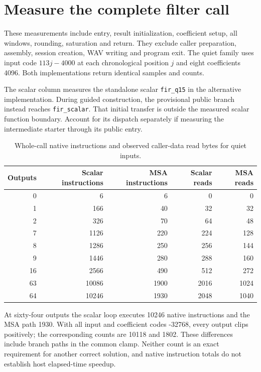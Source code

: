 \section{Measure the complete filter call}
These measurements include entry, result initialization, coefficient setup, all windows,
rounding, saturation and return. They exclude caller preparation, assembly, session
creation, WAV writing and program exit. The quiet family uses input code
\(113j-4000\) at each chronological position \(j\) and eight coefficients 4096.
Both implementations return identical samples and counts.

The scalar column measures the standalone scalar \texttt{fir\_q15} in the
alternative implementation. During guided construction, the provisional public branch
instead reaches \texttt{fir\_scalar}. That initial transfer is outside the measured
scalar function boundary. Account for its dispatch separately if measuring the
intermediate starter through its public entry.

\begin{table}[htbp]
\centering
\caption{Whole-call native instructions and observed caller-data read bytes for quiet inputs.}
\begin{tabular}{rrrrr}
\toprule
Outputs & Scalar instructions & MSA instructions & Scalar reads & MSA reads\\
\midrule
0 & 6 & 6 & 0 & 0\\
1 & 166 & 40 & 32 & 32\\
2 & 326 & 70 & 64 & 48\\
7 & 1126 & 220 & 224 & 128\\
8 & 1286 & 250 & 256 & 144\\
9 & 1446 & 280 & 288 & 160\\
16 & 2566 & 490 & 512 & 272\\
63 & 10086 & 1900 & 2016 & 1024\\
64 & 10246 & 1930 & 2048 & 1040\\
\bottomrule
\end{tabular}
\end{table}

At sixty-four outputs the scalar loop executes 10246 native instructions and the MSA
path 1930. With all input and coefficient codes -32768, every output clips positively;
the corresponding counts are 10118 and 1802. These differences include branch paths
in the common clamp. Neither count is an exact requirement for another correct solution,
and native instruction totals do not establish host elapsed-time speedup.

